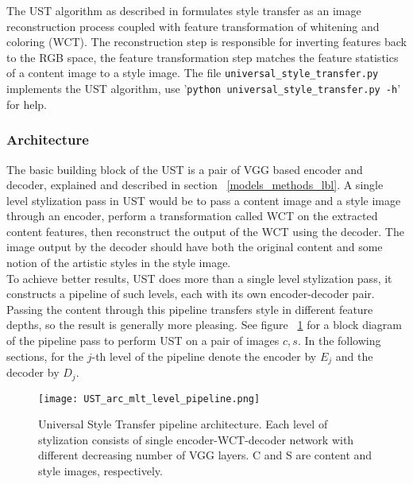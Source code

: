 The UST algorithm as described in \cite{bib11} formulates style transfer as an image reconstruction process coupled with feature transformation of whitening and coloring (WCT). The reconstruction step is responsible for inverting features back to the RGB space, the feature transformation step matches the feature statistics of a content image to a style image. The file \texttt{universal\_style\_transfer.py} implements the UST algorithm, use '\texttt{python universal\_style\_transfer.py -h}' for help.

\subsubsection{Architecture}
The basic building block of the UST is a pair of VGG based encoder and decoder, explained and described in section ~\ref{models_methods_lbl}. A single level stylization pass in UST would be to pass a content image and a style image through an encoder, perform a transformation called WCT on the extracted content features, then reconstruct the output of the WCT using the decoder. The image output by the decoder should have both the original content and some notion of the artistic styles in the style image.\\ To achieve better results, UST does more than a single level stylization pass, it constructs a pipeline of such levels, each with its own encoder-decoder pair. Passing the content through this pipeline transfers style in different feature depths, so the result is generally more pleasing. See figure ~\ref{fig:full-pipeline} for a block diagram of the pipeline pass to perform UST on a pair of images $c,s$. In the following sections, for the $j$-th level of the pipeline denote the encoder by $E_j$ and the decoder by $D_j$.

\begin{figure}[h!]
	\centering
	\texttt{[image: UST\_arc\_mlt\_level\_pipeline.png]}
	\caption{Universal Style Transfer pipeline architecture. Each level of stylization consists of single encoder-WCT-decoder network with different decreasing number of VGG layers. C and S are content and style images, respectively.
	}
	\label{fig:full-pipeline}
\end{figure}

